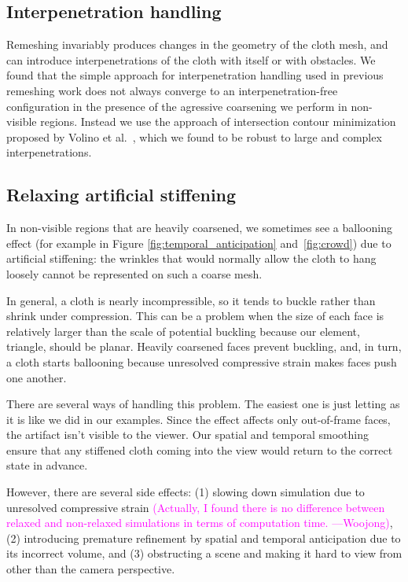 \documentclass[10pt,journal,compsoc,twoside]{TexInputs/IEEEtran}
\newcommand{\woojong}[1]{\textcolor{magenta}{(#1 ---Woojong)}}
\begin{document}
\subsection{Interpenetration handling}

Remeshing invariably produces changes in the geometry of the cloth mesh, and can introduce interpenetrations of the cloth with itself or with obstacles.
We found that the simple approach for interpenetration handling used in previous remeshing work \cite{Narain:2012:AAR} does not always converge to an interpenetration-free configuration in the presence of the agressive coarsening we perform in non-visible regions.
Instead we use the approach of intersection contour minimization proposed by Volino et al.~\cite{Volino:2006:RSC}, which we found to be robust to large and complex interpenetrations.

\subsection{Relaxing artificial stiffening}

In non-visible regions that are heavily coarsened, we sometimes see a ballooning effect
(for example in Figure \ref{fig:temporal_anticipation} and~\ref{fig:crowd}) due to
artificial stiffening: the wrinkles that would normally allow the cloth to hang loosely
cannot be represented on such a coarse mesh.

In general, a cloth is nearly incompressible, so it tends to buckle rather than shrink
under compression.  This can be a problem when the size of each face is
relatively larger than the scale of potential buckling because our element, triangle,
should be planar. Heavily coarsened faces prevent buckling, and, in turn, a cloth starts
ballooning because unresolved compressive strain makes faces push one another.

There are several ways of handling this problem. The easiest one is just letting as it is
like we did in our examples. Since the effect affects only out-of-frame faces, the
artifact isn't visible to the viewer. Our spatial and temporal smoothing ensure that any
stiffened cloth coming into the view would return to the correct state in advance.

However, there are several side effects: (1) slowing down simulation due to unresolved
compressive strain \woojong{Actually, I found there is no difference between relaxed and
non-relaxed simulations in terms of computation time.}, (2) introducing premature
refinement by spatial and temporal anticipation due to its incorrect volume, and (3)
obstructing a scene and making it hard to view from other than the camera perspective.
\end{document}
